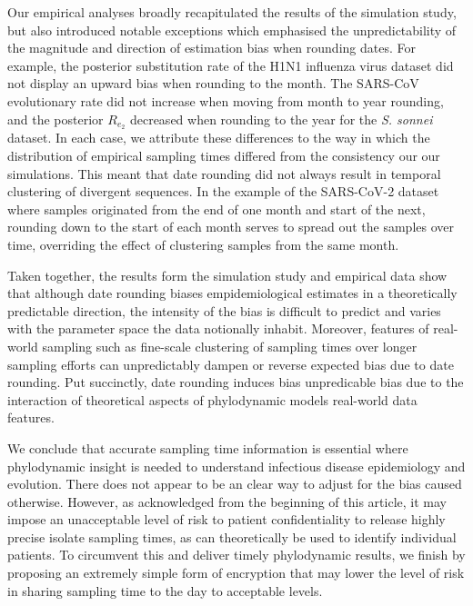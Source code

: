 \documentclass{article}
\begin{document}
\begin{spacing}{1.5}
Our empirical analyses broadly recapitulated the results of the simulation study, but also introduced notable exceptions which emphasised the unpredictability of the magnitude and direction of estimation bias when rounding dates. For example, the posterior substitution rate of the H1N1 influenza virus dataset did not display an upward bias when rounding to the month. The SARS-CoV evolutionary rate did not increase when moving from month to year rounding, and the posterior $R_{e_2}$ decreased when rounding to the year for the \textit{S. sonnei} dataset. In each case, we attribute these differences to the way in which the distribution of empirical sampling times differed from the consistency our our simulations. This meant that date rounding did not always result in temporal clustering of divergent sequences. In the example of the SARS-CoV-2 dataset where samples originated from the end of one month and start of the next, rounding down to the start of each month serves to spread out the samples over time, overriding the effect of clustering samples from the same month.

Taken together, the results form the simulation study and empirical data show that although date rounding biases empidemiological estimates in a theoretically predictable direction, the intensity of the bias is difficult to predict and varies with the parameter space the data notionally inhabit. Moreover, features of real-world sampling such as fine-scale clustering of sampling times over longer sampling efforts can unpredictably dampen or reverse expected bias due to date rounding. Put succinctly, date rounding induces bias unpredicable bias due to the interaction of theoretical aspects of phylodynamic models real-world data features.

We conclude that accurate sampling time information is essential where phylodynamic insight is needed to understand infectious disease epidemiology and evolution. There does not appear to be an clear way to adjust for the bias caused otherwise. However, as acknowledged from the beginning of this article, it may impose an unacceptable level of risk to patient confidentiality to release highly precise isolate sampling times, as can theoretically be used to identify individual patients. To circumvent this and deliver timely phylodynamic results, we finish by proposing an extremely simple form of encryption that may lower the level of risk in sharing sampling time to the day to acceptable levels.


\end{spacing}
\end{document}

